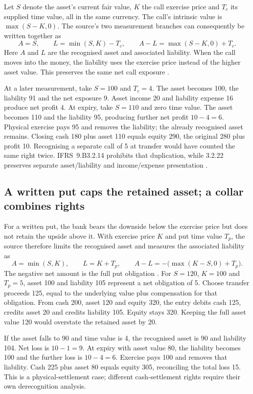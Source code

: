 Let \(S\) denote the asset's current fair value, \(K\) the call exercise
price and \(T_c\) its supplied time value, all in the same currency. The
call's intrinsic value is \(\max(S-K,0)\). The source's two measurement
branches can consequently be written together as
\[
 A=S,\qquad L=\min(S,K)-T_c,\qquad
 A-L=\max(S-K,0)+T_c.
\]
Here \(A\) and \(L\) are the recognised asset and associated liability.
When the call moves into the money, the liability uses the exercise price
instead of the higher asset value. This preserves the same net call exposure
\citep[IFRS~9.B3.2.13(c)]{eu20231803}.

At a later measurement, take \(S=100\) and \(T_c=4\). The asset becomes
100, the liability 91 and the net exposure 9. Asset income 20 and liability
expense 16 produce net profit 4. At expiry, take \(S=110\) and zero time
value. The asset becomes 110 and the liability 95, producing further net
profit \(10-4=6\). Physical exercise pays 95 and removes the liability;
the already recognised asset remains. Closing cash 180 plus asset 110 equals
equity 290, the original 280 plus profit 10. Recognising a separate call of
5 at transfer would have counted the same right twice. IFRS~9.B3.2.14
prohibits that duplication, while 3.2.22 preserves separate asset/liability
and income/expense presentation \citep[IFRS~9.3.2.19, 3.2.22, B3.2.14]{eu20231803}.

\subsection{A written put caps the retained asset; a collar combines rights}

For a written put, the bank bears the downside below the exercise price but
does not retain the upside above it. With exercise price \(K\) and put time
value \(T_p\), the source therefore limits the recognised asset and measures
the associated liability as
\[
 A=\min(S,K),\qquad L=K+T_p,\qquad
 A-L=-\bigl(\max(K-S,0)+T_p\bigr).
\]
The negative net amount is the full put obligation
\citep[IFRS~9.B3.2.13(d)]{eu20231803}. For \(S=120\), \(K=100\) and
\(T_p=5\), asset 100 and liability 105 represent a net obligation of 5.
Choose transfer proceeds 125, equal to the underlying value plus compensation
for that obligation. From cash 200, asset 120 and equity 320, the entry debits
cash 125, credits asset 20 and credits liability 105. Equity stays 320.
Keeping the full asset value 120 would overstate the retained asset by 20.

If the asset falls to 90 and time value is 4, the recognised asset is 90 and
liability 104. Net loss is \(10-1=9\). At expiry with asset value 80,
the liability becomes 100 and the further loss is \(10-4=6\). Exercise
pays 100 and removes that liability. Cash 225 plus asset 80 equals equity
305, reconciling the total loss 15. This is a physical-settlement case;
different cash-settlement rights require their own derecognition analysis.

